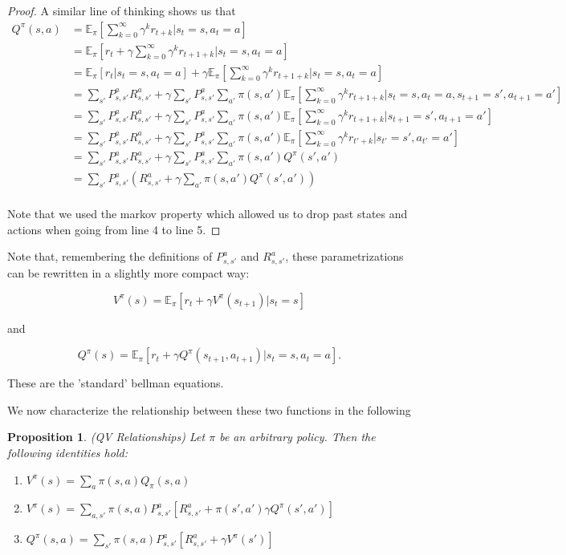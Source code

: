 \documentclass[11pt]{article} %
\newtheorem{prop}{Proposition}
\begin{document}
\begin{proof}
A similar line of thinking shows us that
	\[
		\begin{array}{rl}
			Q^{\pi}(s,a)	& = \mathbb{E}_{\pi}[\sum_{k=0}^{\infty} \gamma^k r_{t+k} | s_t = s, a_t = a]  \\
						& = \mathbb{E}_{\pi}[r_t + \gamma \sum_{k=0}^{\infty} \gamma^k r_{t+1+k} | s_t = s, a_t = a]  \\
						& = \mathbb{E}_{\pi}[r_t | s_t = s, a_t = a] + \gamma \mathbb{E}_{\pi}[ \sum_{k=0}^{\infty} \gamma^k r_{t+1+k} | s_t = s, a_t = a] \\
						& = \sum_{s'} P_{s,s'}^a R_{s,s'}^a + \gamma \sum_{s'} P_{s,s'}^a \sum_{a'} \pi(s,a') \mathbb{E}_{\pi}[\sum_{k=0}^{\infty} \gamma^k r_{t+1+k} | s_t = s, a_t = a, s_{t+1} = s', a_{t+1} = a'] \\
						& = \sum_{s'} P_{s,s'}^a R_{s,s'}^a + \gamma \sum_{s'} P_{s,s'}^a \sum_{a'} \pi(s,a') \mathbb{E}_{\pi}[\sum_{k=0}^{\infty} \gamma^k r_{t+1+k} | s_{t+1} = s', a_{t+1} = a'] \\
						& = \sum_{s'} P_{s,s'}^a R_{s,s'}^a + \gamma \sum_{s'} P_{s,s'}^a \sum_{a'} \pi(s,a') \mathbb{E}_{\pi}[\sum_{k=0}^{\infty} \gamma^k r_{t'+k} | s_{t'} = s', a_{t'} = a'] \\
						& = \sum_{s'} P_{s,s'}^a R_{s,s'}^a + \gamma \sum_{s'} P_{s,s'}^a \sum_{a'} \pi(s,a') Q^{\pi}(s',a') \\
						& = \sum_{s'} P_{s,s'}^a ( R_{s,s'}^a + \gamma \sum_{a'} \pi(s,a') Q^{\pi}(s',a') )  \\
		\end{array}
	\]

Note that we used the markov property which allowed us to drop past states and actions when going from line 4 to line 5.

\end{proof}

Note that, remembering the definitions of $P_{s,s'}^a$ and $R_{s,s'}^a$, these parametrizations can be rewritten in a slightly more compact way:

$$ V^{\pi}(s) =  \mathbb{E}_{\pi}[r_t + \gamma V^{\pi}(s_{t+1}) | s_t = s ] $$

and 

$$ Q^{\pi}(s) = \mathbb{E}_{\pi}[r_t + \gamma Q^{\pi}(s_{t+1},a_{t+1}) | s_t = s, a_t = a]. $$

These are the 'standard' bellman equations.

We now characterize the relationship between these two functions in the following

\begin{prop}{(QV Relationships)}
	Let $\pi$ be an arbitrary policy. Then the following identities hold:
	\begin{enumerate}
		\item $V^{\pi}(s) = \sum_a \pi(s,a) Q_{\pi}(s,a)$ \\
		\item $V^{\pi}(s) = \sum_{a,s'}  \pi(s,a) P_{s,s'}^a [ R_{s,s'}^a + \pi(s',a') \gamma Q^{\pi}(s',a')] $ \\
		\item $Q^{\pi}(s,a) = \sum_{s'} \pi(s,a) P_{s,s'}^a [ R_{s,s'}^a + \gamma V^{\pi}(s') ] $
	\end{enumerate}
\end{prop}
\end{document}
